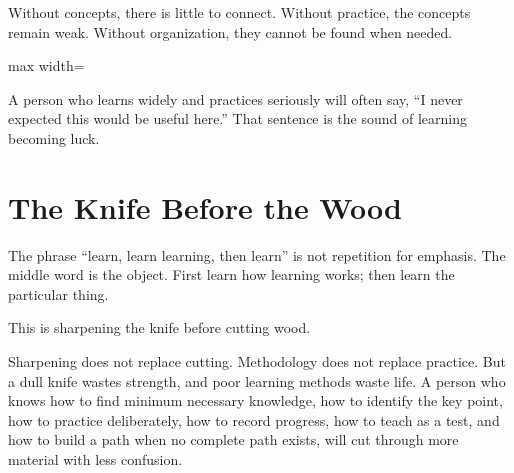 Without concepts, there is little to connect. Without practice, the concepts remain weak. Without organization, they cannot be found when needed.

\begin{center}
\begin{adjustbox}{max width=\linewidth}
\end{adjustbox}
\end{center}

A person who learns widely and practices seriously will often say, ``I never expected this would be useful here.'' That sentence is the sound of learning becoming luck.

\section*{The Knife Before the Wood}

The phrase ``learn, learn learning, then learn'' is not repetition for emphasis. The middle word is the object. First learn how learning works; then learn the particular thing.

This is sharpening the knife before cutting wood.

Sharpening does not replace cutting. Methodology does not replace practice. But a dull knife wastes strength, and poor learning methods waste life. A person who knows how to find minimum necessary knowledge, how to identify the key point, how to practice deliberately, how to record progress, how to teach as a test, and how to build a path when no complete path exists, will cut through more material with less confusion.

